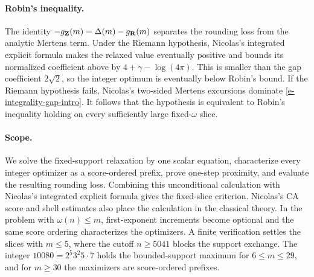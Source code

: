 \paragraph{Robin's inequality.}
The identity
\(-g_{\mathbf{Z}}(m)=\Delta(m)-g_{\mathbf{R}}(m)\) separates the rounding loss
from the analytic Mertens term. Under the Riemann hypothesis, Nicolas's
integrated explicit formula makes the relaxed value eventually positive
and bounds its normalized coefficient above by
\(4+\gamma-\log(4\pi)\). This is smaller than the gap coefficient
\(2\sqrt2\), so the integer optimum is eventually below Robin's bound. If
the Riemann hypothesis fails, Nicolas's two-sided Mertens excursions
dominate \eqref{e-integrality-gap-intro}. It follows that the hypothesis
is equivalent to Robin's inequality holding on every sufficiently large
fixed-\(\omega\) slice.

\paragraph{Scope.}
We solve the fixed-support relaxation by one scalar equation, characterize
every integer optimizer as a score-ordered prefix, prove one-step
proximity, and evaluate the resulting rounding loss. Combining this
unconditional calculation with Nicolas's integrated explicit formula
gives the fixed-slice criterion. Nicolas's CA score and shell estimates
also place the calculation in the classical theory. In the problem with
\(\omega(n)\leq m\), first-exponent increments become optional and the
same score ordering characterizes the optimizers. A finite verification
settles the slices with \(m\leq5\), where the cutoff \(n\geq5041\)
blocks the support exchange. The integer
\(10080=2^{5}3^{2}5\cdot7\) holds the bounded-support maximum for
\(6\leq m\leq29\), and for \(m\geq30\) the maximizers are score-ordered
prefixes.
